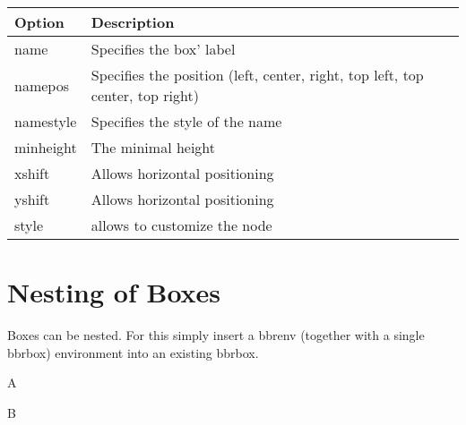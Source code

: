 \documentclass[a4paper]{report}
\begin{document}
\begin{center}
\begin{tabular}{ll}
\textbf{Option} & \textbf{Description} \\ \hline
name & Specifies the box' label \\
namepos & Specifies the position (left, center, right, top left, top center, top right) \\
namestyle & Specifies the style of the name \\
minheight & The minimal height \\
xshift & Allows horizontal positioning \\
yshift & Allows horizontal positioning \\
style & allows to customize the node
\end{tabular}
\end{center}


\section{Nesting of Boxes}
Boxes can be nested. For this simply insert a bbrenv (together with a single bbrbox) environment into an
existing bbrbox.

\begin{bbrenv}{A}
	\begin{bbrbox}[name=Box Name]

	\begin{bbrenv}{B}
		\begin{bbrbox}[name=Inner Box]
		\end{bbrbox}
	\end{bbrenv}

	\end{bbrbox}
\end{bbrenv}
\end{document}

